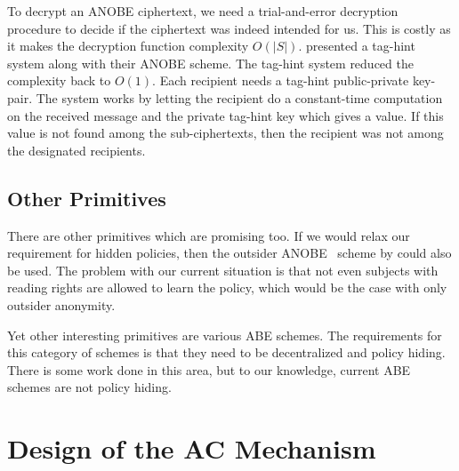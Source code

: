 %
%

To decrypt an \ac{ANOBE} ciphertext, we need a trial-and-error decryption 
procedure to decide if the ciphertext was indeed intended for us.
This is costly as it makes the decryption function complexity \(O(|S|)\).
\citet{ANOBE} presented a tag-hint system along with their \ac{ANOBE} scheme.
The tag-hint system reduced the complexity back to \(O(1)\).
Each recipient needs a tag-hint public-private key-pair.
The system works by letting the recipient do a constant-time computation on the 
received message and the private tag-hint key which gives a value.
If this value is not found among the sub-ciphertexts, then the recipient was 
not among the designated recipients.

\subsection{Other Primitives}

There are other primitives which are promising too.
If we would relax our requirement for hidden policies, then the outsider 
\ac{ANOBE}~\cite{oANOBE} scheme by \citeauthor{oANOBE} could also be used.
The problem with our current situation is that not even subjects with reading 
rights are allowed to learn the policy, which would be the case with only 
outsider anonymity.

Yet other interesting primitives are various \ac{ABE} schemes.
The requirements for this category of schemes is that they need to be 
decentralized and policy hiding.
There is some work done in this area, but to our knowledge, current \ac{ABE} 
schemes are not policy hiding.


\section[Scheme Design]{Design of the \acl*{AC} Mechanism}\label{Design}

